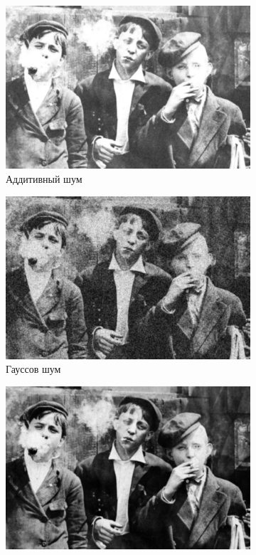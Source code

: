 \begin{figure}[ht]
\begin{subfigure}[b]{0.5\linewidth}
      \includegraphics[width=0.95\linewidth]{../Gaussian_Blur/Gaussian_Blur_Additive_noise_(7,7).jpg} 
      \caption{Аддитивный шум} 
      \label{gaussian_7:c} 
      \vspace{4ex}
    \end{subfigure}%
    \begin{subfigure}[b]{0.5\linewidth}
      \centering
      \includegraphics[width=0.95\linewidth]{../Gaussian_Blur/Gaussian_Blur_Gaussian_noise_(7,7).jpg} 
      \caption{Гауссов шум} 
      \label{gaussian_7:d} 
      \vspace{4ex}
    \end{subfigure}
    \begin{subfigure}[b]{0.5\linewidth}
      \centering
      \includegraphics[width=0.95\linewidth]{../Gaussian_Blur/Gaussian_Blur_Poisson_noise_(7,7).jpg} 

\end{subfigure}
\end{figure}
